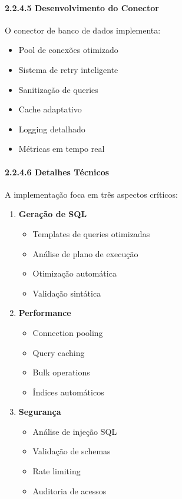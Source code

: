 \documentclass[
]{article}
\providecommand{\tightlist}{%
  \setlength{\itemsep}{0pt}\setlength{\parskip}{0pt}}
\begin{document}
\paragraph{2.2.4.5 Desenvolvimento do
Conector}\label{desenvolvimento-do-conector}

O conector de banco de dados implementa:

\begin{itemize}
\tightlist
\item
  Pool de conexões otimizado
\item
  Sistema de retry inteligente
\item
  Sanitização de queries
\item
  Cache adaptativo
\item
  Logging detalhado
\item
  Métricas em tempo real
\end{itemize}

\paragraph{2.2.4.6 Detalhes Técnicos}\label{detalhes-tuxe9cnicos-2}

A implementação foca em três aspectos críticos:

\begin{enumerate}
\def\labelenumi{\arabic{enumi}.}
\item
  \textbf{Geração de SQL}

  \begin{itemize}
  \tightlist
  \item
    Templates de queries otimizadas
  \item
    Análise de plano de execução
  \item
    Otimização automática
  \item
    Validação sintática
  \end{itemize}
\item
  \textbf{Performance}

  \begin{itemize}
  \tightlist
  \item
    Connection pooling
  \item
    Query caching
  \item
    Bulk operations
  \item
    Índices automáticos
  \end{itemize}
\item
  \textbf{Segurança}

  \begin{itemize}
  \tightlist
  \item
    Análise de injeção SQL
  \item
    Validação de schemas
  \item
    Rate limiting
  \item
    Auditoria de acessos
  \end{itemize}
\end{enumerate}
\end{document}
